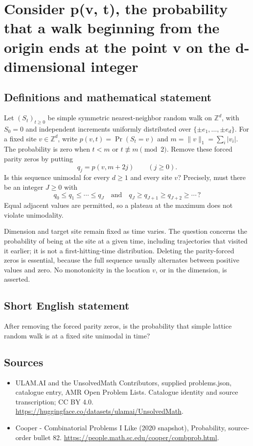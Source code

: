 \documentclass[11pt,a4paper]{article}
\begin{document}
\section*{Consider p(v, t), the probability that a walk beginning from the origin ends at the point v on the d-dimensional integer}\label{statement}

\subsection{Definitions and mathematical statement}
Let $(S_t)_{t\ge0}$ be simple symmetric nearest-neighbor random
walk on $\mathbb Z^d$, with $S_0=0$ and independent increments
uniformly distributed over $\{\pm e_1,\ldots,\pm e_d\}$.
For a fixed site $v\in\mathbb Z^d$, write
$p(v,t)=\Pr(S_t=v)$ and $m=\|v\|_1=\sum_i|v_i|$.
The probability is zero when $t<m$ or $t\not\equiv m\pmod2$.
Remove these forced parity zeros by putting
\[
                       q_j=p(v,m+2j)\qquad(j\ge0).
\]
Is this sequence unimodal for every $d\ge1$ and every site $v$?
Precisely, must there be an integer $J\ge0$ with
\[
 q_0\le q_1\le\cdots\le q_J
                  \quad\text{and}\quad
 q_J\ge q_{J+1}\ge q_{J+2}\ge\cdots\,?
\]
Equal adjacent values are permitted, so a plateau at the maximum
does not violate unimodality.

Dimension and target site remain fixed as time varies. The
question concerns the probability of being at the site at a
given time, including trajectories that visited it earlier;
it is not a first-hitting-time distribution. Deleting the
parity-forced zeros is essential, because the full sequence
usually alternates between positive values and zero. No
monotonicity in the location $v$, or in the dimension, is asserted.
\subsection{Short English statement}
After removing the forced parity zeros, is the probability that simple lattice random walk is at a fixed site unimodal in time?
\subsection{Sources}
\begin{itemize}
\item[S1] ULAM.AI and the UnsolvedMath Contributors, supplied problems.json, catalogue entry, AMR Open Problem Lists. Catalogue identity and source transcription; CC BY 4.0.
\url{https://huggingface.co/datasets/ulamai/UnsolvedMath}.
\item[S2] Cooper - Combinatorial Problems I Like (2020 snapshot), Probability, source-order bullet 82. 
\url{https://people.math.sc.edu/cooper/combprob.html}.
\end{itemize}
\end{document}
